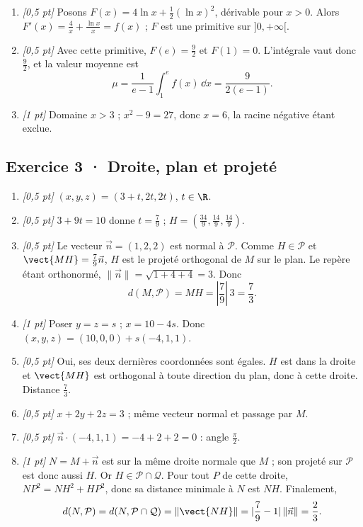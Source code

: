 \begin{enumerate}
\item \textit{[0,5 pt]} Posons $F(x)=4\ln x+\frac12(\ln x)^2$, dérivable pour $x>0$. Alors $F'(x)=\frac{4}{x}+\frac{\ln x}{x}=f(x)$ ; $F$ est une primitive sur $]0,+\infty[$.

\item \textit{[0,5 pt]} Avec cette primitive, $F(e)=\frac{9}{2}$ et $F(1)=0$. L'intégrale vaut donc $\frac{9}{2}$, et la valeur moyenne est
\[\mu=\frac{1}{e-1}\int_1^e f(x)\,\dd x=\frac{9}{2(e-1)}.\]

\item \textit{[1 pt]} Domaine $x>3$ ; $x^2-9=27$, donc $x=6$, la racine négative étant exclue.

\end{enumerate}

\subsection*{Exercice 3 · Droite, plan et projeté}\begin{enumerate}

\item \textit{[0,5 pt]} $(x,y,z)=(3+t,2t,2t)$, $t\in\R$.

\item \textit{[0,5 pt]} $3+9t=10$ donne $t=\frac{7}{9}$ ; $H=(\frac{34}{9},\frac{14}{9},\frac{14}{9})$.

\item \textit{[0,5 pt]} Le vecteur $\vec n=(1,2,2)$ est normal à $\mathcal P$. Comme $H\in\mathcal P$ et $\vect{MH}=\frac{7}{9}\vec n$, $H$ est le projeté orthogonal de $M$ sur le plan. Le repère étant orthonormé, $\|\vec n\|=\sqrt{1+4+4}=3$. Donc
\[d(M,\mathcal P)=MH=|\frac{7}{9}|\,3=\frac{7}{3}.\]

\item \textit{[1 pt]} Poser $y=z=s$ ; $x=10-4s$. Donc $(x,y,z)=(10,0,0)+s(-4,1,1)$.

\item \textit{[0,5 pt]} Oui, ses deux dernières coordonnées sont égales. $H$ est dans la droite et $\vect{MH}$ est orthogonal à toute direction du plan, donc à cette droite. Distance $\frac{7}{3}$.

\item \textit{[0,5 pt]} $x+2y+2z=3$ ; même vecteur normal et passage par $M$.

\item \textit{[0,5 pt]} $\vec n\cdot(-4,1,1)=-4+2+2=0$ : angle $\frac{\pi}{2}$.

\item \textit{[1 pt]} $N=M+\vec n$ est sur la même droite normale que $M$ ; son projeté sur $\mathcal P$ est donc aussi $H$. Or $H\in\mathcal P\cap\mathcal Q$. Pour tout $P$ de cette droite, $NP^2=NH^2+HP^2$, donc sa distance minimale à $N$ est $NH$. Finalement,
\[d(N,\mathcal P)=d(N,\mathcal P\cap\mathcal Q)=\|\vect{NH}\|=|\frac{7}{9}-1|\,\|\vec n\|=\frac{2}{3}.\]

\end{enumerate}

